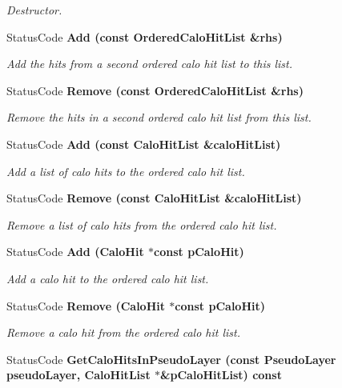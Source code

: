 \begin{CompactItemize}
\begin{CompactList}\small\item\em Destructor. \item\end{CompactList}\item 
Status\-Code \bf{Add} (const \bf{Ordered\-Calo\-Hit\-List} \&rhs)
\begin{CompactList}\small\item\em Add the hits from a second ordered calo hit list to this list. \item\end{CompactList}\item 
Status\-Code \bf{Remove} (const \bf{Ordered\-Calo\-Hit\-List} \&rhs)
\begin{CompactList}\small\item\em Remove the hits in a second ordered calo hit list from this list. \item\end{CompactList}\item 
Status\-Code \bf{Add} (const Calo\-Hit\-List \&calo\-Hit\-List)
\begin{CompactList}\small\item\em Add a list of calo hits to the ordered calo hit list. \item\end{CompactList}\item 
Status\-Code \bf{Remove} (const Calo\-Hit\-List \&calo\-Hit\-List)
\begin{CompactList}\small\item\em Remove a list of calo hits from the ordered calo hit list. \item\end{CompactList}\item 
Status\-Code \bf{Add} (\bf{Calo\-Hit} $\ast$const p\-Calo\-Hit)
\begin{CompactList}\small\item\em Add a calo hit to the ordered calo hit list. \item\end{CompactList}\item 
Status\-Code \bf{Remove} (\bf{Calo\-Hit} $\ast$const p\-Calo\-Hit)
\begin{CompactList}\small\item\em Remove a calo hit from the ordered calo hit list. \item\end{CompactList}\item 
Status\-Code \bf{Get\-Calo\-Hits\-In\-Pseudo\-Layer} (const Pseudo\-Layer pseudo\-Layer, Calo\-Hit\-List $\ast$\&p\-Calo\-Hit\-List) const 

\end{CompactItemize}
